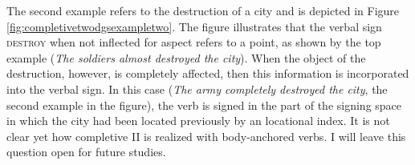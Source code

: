 The second example refers to the destruction of a city and is depicted in Figure \ref{fig:completivetwodgsexampletwo}. The figure illustrates that the verbal sign \textsc{destroy} when not inflected for aspect refers to a point, as shown by the top example (\textit{The soldiers almost destroyed the city}). When the object of the destruction, however, is completely affected, then this information is incorporated into the verbal sign. In this case (\textit{The army completely destroyed the city}, the second example in the figure), the verb is signed in the part of the signing space in which the city had been located previously by an locational index. It is not clear yet how completive II is realized with body-anchored verbs. I will leave this question open for future studies.



